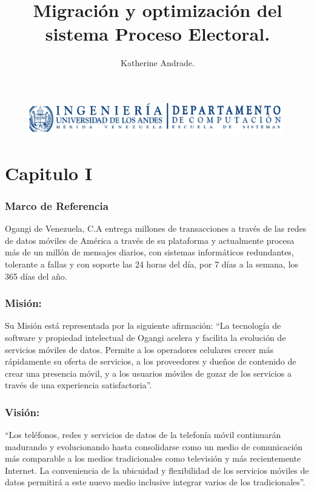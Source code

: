 \documentclass[spanish]{article}
\title{Migración y optimización del sistema Proceso Electoral.}
\author{Katherine Andrade.}
\date{}
\begin{document}
\begin{figure}
	\centering
	\includegraphics[width=0.99\textwidth]{Logo_computacion}
\end{figure}


\maketitle

\section{Capitulo I}

\subsubsection{Marco de Referencia}
Ogangi de Venezuela, C.A entrega millones de transacciones a través de las redes de
datos móviles de América a través de su plataforma y actualmente procesa más de un millón de
mensajes diarios, con sistemas informáticos redundantes, tolerante a fallas y con soporte las 24
horas del día, por 7 días a la semana, los 365 días del año.

\subsubsection{Misión:}
Su Misión está representada por la siguiente afirmación:
“La tecnología de software y propiedad intelectual de Ogangi acelera y facilita la evolución
de servicios móviles de datos. Permite a los operadores celulares crecer más rápidamente su
oferta de servicios, a los proveedores y dueños de contenido de crear una presencia móvil, y a
los usuarios móviles de gozar de los servicios a través de una experiencia satisfactoria”.

\subsubsection{Visión:}
“Los teléfonos, redes y servicios de datos de la telefonía móvil continuarán madurando y
evolucionando hasta consolidarse como un medio de comunicación más comparable a los
medios tradicionales como televisión y más recientemente Internet. La conveniencia de la
ubicuidad y flexibilidad de los servicios móviles de datos permitirá a este nuevo medio inclusive
integrar varios de los tradicionales”. \\
\end{document}
